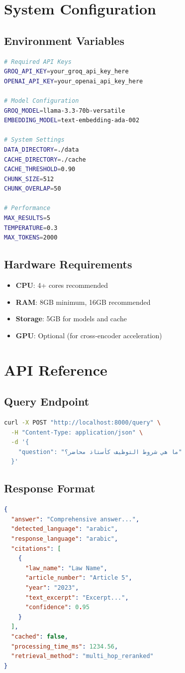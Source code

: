 \documentclass[12pt,a4paper]{article}
\begin{document}
\appendix

\section{System Configuration}

\subsection{Environment Variables}
\begin{lstlisting}[language=bash, caption=.env Configuration]
# Required API Keys
GROQ_API_KEY=your_groq_api_key_here
OPENAI_API_KEY=your_openai_api_key_here

# Model Configuration
GROQ_MODEL=llama-3.3-70b-versatile
EMBEDDING_MODEL=text-embedding-ada-002

# System Settings
DATA_DIRECTORY=./data
CACHE_DIRECTORY=./cache
CACHE_THRESHOLD=0.90
CHUNK_SIZE=512
CHUNK_OVERLAP=50

# Performance
MAX_RESULTS=5
TEMPERATURE=0.3
MAX_TOKENS=2000
\end{lstlisting}

\subsection{Hardware Requirements}
\begin{itemize}
    \item \textbf{CPU}: 4+ cores recommended
    \item \textbf{RAM}: 8GB minimum, 16GB recommended
    \item \textbf{Storage}: 5GB for models and cache
    \item \textbf{GPU}: Optional (for cross-encoder acceleration)
\end{itemize}

\section{API Reference}

\subsection{Query Endpoint}
\begin{lstlisting}[language=bash, caption=POST /query]
curl -X POST "http://localhost:8000/query" \
  -H "Content-Type: application/json" \
  -d '{
    "question": "ما هي شروط التوظيف كأستاذ محاضر؟"
  }'
\end{lstlisting}

\subsection{Response Format}
\begin{lstlisting}[language=json, caption=Response JSON]
{
  "answer": "Comprehensive answer...",
  "detected_language": "arabic",
  "response_language": "arabic",
  "citations": [
    {
      "law_name": "Law Name",
      "article_number": "Article 5",
      "year": "2023",
      "text_excerpt": "Excerpt...",
      "confidence": 0.95
    }
  ],
  "cached": false,
  "processing_time_ms": 1234.56,
  "retrieval_method": "multi_hop_reranked"
}
\end{lstlisting}
\end{document}
